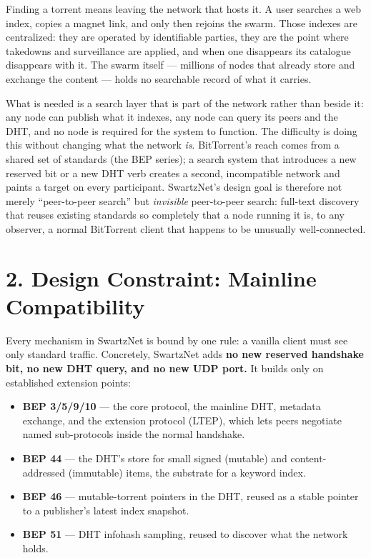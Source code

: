 \documentclass[11pt]{article}
\providecommand{\tightlist}{\setlength{\itemsep}{0pt}\setlength{\parskip}{0pt}}
\begin{document}
Finding a torrent means leaving the network that hosts it. A user
searches a web index, copies a magnet link, and only then rejoins the
swarm. Those indexes are centralized: they are operated by identifiable
parties, they are the point where takedowns and surveillance are
applied, and when one disappears its catalogue disappears with it. The
swarm itself --- millions of nodes that already store and exchange the
content --- holds no searchable record of what it carries.

What is needed is a search layer that is part of the network rather than
beside it: any node can publish what it indexes, any node can query its
peers and the DHT, and no node is required for the system to function.
The difficulty is doing this without changing what the network
\emph{is}. BitTorrent's reach comes from a shared set of standards (the
BEP series); a search system that introduces a new reserved bit or a new
DHT verb creates a second, incompatible network and paints a target on
every participant. SwartzNet's design goal is therefore not merely
``peer-to-peer search'' but \emph{invisible} peer-to-peer search:
full-text discovery that reuses existing standards so completely that a
node running it is, to any observer, a normal BitTorrent client that
happens to be unusually well-connected.

\hypertarget{design-constraint-mainline-compatibility}{%
\section{2. Design Constraint: Mainline
Compatibility}\label{design-constraint-mainline-compatibility}}

Every mechanism in SwartzNet is bound by one rule: a vanilla client must
see only standard traffic. Concretely, SwartzNet adds \textbf{no new
reserved handshake bit, no new DHT query, and no new UDP port.} It
builds only on established extension points:

\begin{itemize}
\tightlist
\item
  \textbf{BEP 3/5/9/10} --- the core protocol, the mainline DHT,
  metadata exchange, and the extension protocol (LTEP), which lets peers
  negotiate named sub-protocols inside the normal handshake.
\item
  \textbf{BEP 44} --- the DHT's store for small signed (mutable) and
  content-addressed (immutable) items, the substrate for a keyword
  index.
\item
  \textbf{BEP 46} --- mutable-torrent pointers in the DHT, reused as a
  stable pointer to a publisher's latest index snapshot.
\item
  \textbf{BEP 51} --- DHT infohash sampling, reused to discover what the
  network holds.
\end{itemize}
\end{document}
